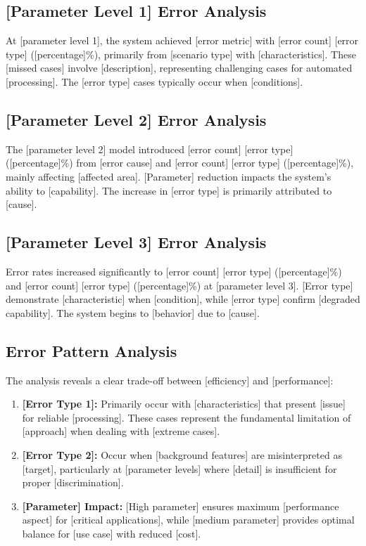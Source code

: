 \subsection{[Parameter Level 1] Error Analysis}

At [parameter level 1], the system achieved [error metric] with [error count] [error type] ([percentage]\%), primarily from [scenario type] with [characteristics]. These [missed cases] involve [description], representing challenging cases for automated [processing]. The [error type] cases typically occur when [conditions].

\subsection{[Parameter Level 2] Error Analysis}

The [parameter level 2] model introduced [error count] [error type] ([percentage]\%) from [error cause] and [error count] [error type] ([percentage]\%), mainly affecting [affected area]. [Parameter] reduction impacts the system's ability to [capability]. The increase in [error type] is primarily attributed to [cause].

\subsection{[Parameter Level 3] Error Analysis}

Error rates increased significantly to [error count] [error type] ([percentage]\%) and [error count] [error type] ([percentage]\%) at [parameter level 3]. [Error type] demonstrate [characteristic] when [condition], while [error type] confirm [degraded capability]. The system begins to [behavior] due to [cause].

\subsection{Error Pattern Analysis}

The analysis reveals a clear trade-off between [efficiency] and [performance]:

\begin{enumerate}
\item \textbf{[Error Type 1]:} Primarily occur with [characteristics] that present [issue] for reliable [processing]. These cases represent the fundamental limitation of [approach] when dealing with [extreme cases].

\item \textbf{[Error Type 2]:} Occur when [background features] are misinterpreted as [target], particularly at [parameter levels] where [detail] is insufficient for proper [discrimination].

\item \textbf{[Parameter] Impact:} [High parameter] ensures maximum [performance aspect] for [critical applications], while [medium parameter] provides optimal balance for [use case] with reduced [cost].
\end{enumerate}

